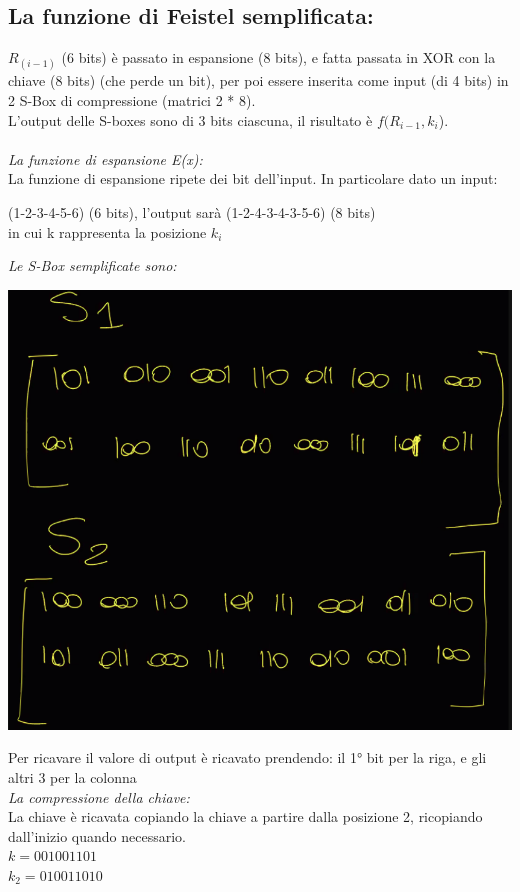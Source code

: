 \documentclass[11pt, oneside]{article}   	%
\begin{document}
{\subsection*{La funzione di Feistel semplificata:}
\(R_{(i-1)}\) (6 bits) è passato in espansione (8 bits), e fatta passata in XOR con la chiave (8 bits) (che perde un bit), per poi essere inserita come input (di 4 bits) in 2 S-Box di compressione (matrici 2 * 8).\\
L'output delle S-boxes sono di 3 bits ciascuna, il risultato è \(f(R_{i-1}, k_i\)).\\\\
\emph{La funzione di espansione E(x):}\\
La funzione di espansione ripete dei bit dell'input. In particolare dato un input:\begin{center}
(1-2-3-4-5-6) (6 bits), l'output sarà (1-2-4-3-4-3-5-6) (8 bits) \\in cui k rappresenta la posizione \(k_i\)\\
\end{center}
\emph{Le S-Box semplificate sono:}
\begin{center}
\includegraphics[scale= 0.5]{ssbox}\\
\end{center}
Per ricavare il valore di output è ricavato prendendo: il 1° bit per la riga, e gli altri 3 per la colonna\\
\emph{La compressione della chiave:}\\
La chiave è ricavata copiando la chiave a partire dalla posizione 2, ricopiando dall'inizio quando necessario.\\
\(k = 001001101\)\\
\(k_2 = 010011010\)\\
}
\end{document}
